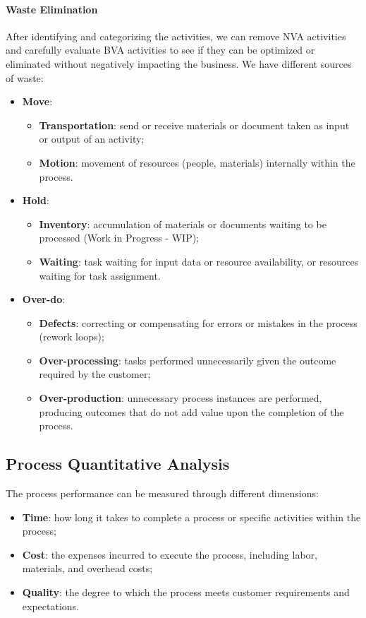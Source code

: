 \paragraph{Waste Elimination} After identifying and categorizing the activities, we can remove NVA activities and 
carefully evaluate BVA activities to see if they can be optimized or eliminated without negatively impacting the business.
We have different sources of waste:
\begin{itemize}
    \item \textbf{Move}:
        \begin{itemize}
            \item \textbf{Transportation}: send or receive materials or document taken as input or output of an activity;
            \item \textbf{Motion}: movement of resources (people, materials) internally within the process.
        \end{itemize}
    \item \textbf{Hold}:
        \begin{itemize}
            \item \textbf{Inventory}: accumulation of materials or documents waiting to be processed (Work in Progress - WIP);
            \item \textbf{Waiting}: task waiting for input data or resource availability, or resources waiting for task assignment.
        \end{itemize}
    \item \textbf{Over-do}:
        \begin{itemize}
            \item \textbf{Defects}: correcting or compensating for errors or mistakes in the process (rework loops);
            \item \textbf{Over-processing}: tasks performed unnecessarily given the outcome required by the customer;
            \item \textbf{Over-production}: unnecessary process instances are performed, producing outcomes that do not add value upon the completion of the process.
        \end{itemize}
\end{itemize}

\subsection{Process Quantitative Analysis}
The process performance can be measured through different dimensions:
\begin{itemize}
    \item \textbf{Time}: how long it takes to complete a process or specific activities within the process;
    \item \textbf{Cost}: the expenses incurred to execute the process, including labor, materials, and overhead costs;
    \item \textbf{Quality}: the degree to which the process meets customer requirements and expectations.
\end{itemize}

